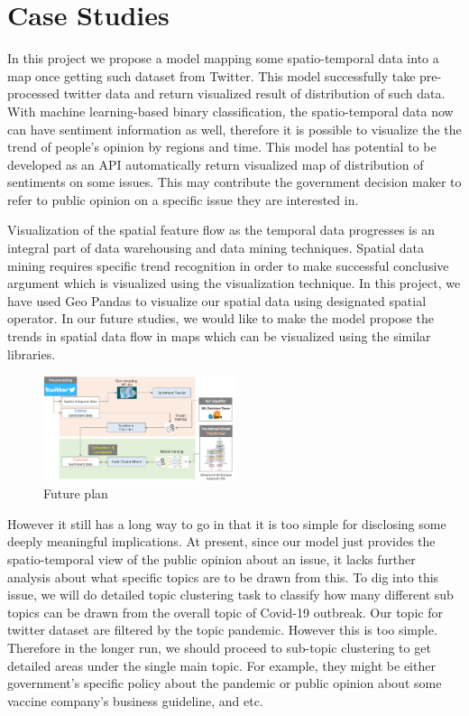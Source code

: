 \section{Case Studies}
\label{sec:case}
In this project we propose a model mapping some spatio-temporal data into a
map once getting such dataset from Twitter. This model successfully take
pre-processed twitter data and return visualized result of distribution of
such data. With machine learning-based binary classification, the
spatio-temporal data now can have sentiment information as well, therefore it
is possible to visualize the the trend of people's opinion by regions and
time. This model has potential to be developed as an API automatically return
visualized map of distribution of sentiments on some issues. This may
contribute the government decision maker to refer to public opinion on a
specific issue they are interested in. 

Visualization of the spatial feature flow as the temporal data progresses is
an integral part of data warehousing and data mining techniques. Spatial data
mining requires specific trend recognition in order to make successful
conclusive argument which is visualized using the visualization technique. In
this project, we have used Geo Pandas to visualize our spatial data using
designated spatial operator. In our future studies, we would like to make the
model propose the trends in spatial data flow in maps which can be visualized
using the similar libraries.
\begin{figure}[H]
\centering
\includegraphics[width=0.5\textwidth]{imgs/Research_Process.png}
\caption{\label{fig:Future plan}Future plan}
\end{figure}
However it still has a long way to go in that it is too simple for disclosing
some deeply meaningful implications. At present, since our model just
provides the spatio-temporal view of the public opinion about an issue, it
lacks further analysis about what specific topics are to be drawn from this.
To dig into this issue, we will do detailed topic clustering task to classify
how many different sub topics can be drawn from the overall topic of Covid-19
outbreak. Our topic for twitter dataset are filtered by the topic pandemic.
However this is too simple. Therefore in the longer run, we should proceed to
sub-topic clustering to get detailed areas under the single main topic. For
example, they might be either government's specific policy about the pandemic
or public opinion about some vaccine company's business guideline, and etc.

